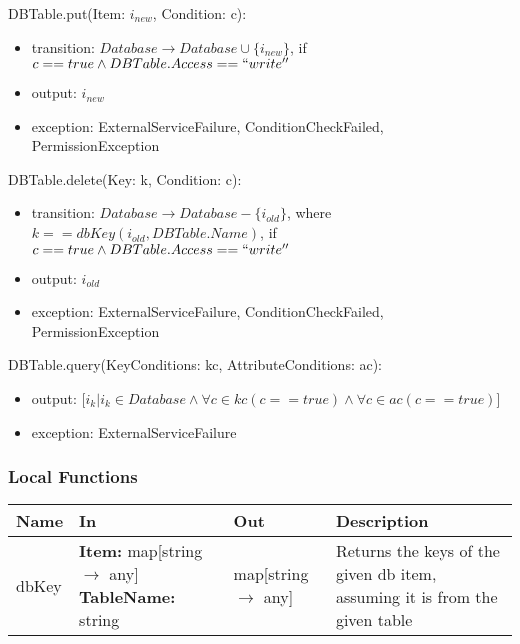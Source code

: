 \documentclass[12pt, titlepage]{article}
\begin{document}
\noindent DBTable.put(Item: $i_{new}$, Condition: c):
\begin{itemize}
  \item transition: $Database \rightarrow Database \cup \{i_{new}\}$, if
    $c == true \land DBTable.Access == ``write''$
  \item output: $i_{new}$
  \item exception: ExternalServiceFailure, ConditionCheckFailed,
    PermissionException
\end{itemize}

\noindent DBTable.delete(Key: k, Condition: c):
\begin{itemize}
  \item transition: $Database \rightarrow Database - \{i_{old}\}$, where
    $k==dbKey(i_{old}, DBTable.Name)$, if $c == true \land
    DBTable.Access == ``write''$
  \item output: $i_{old}$
  \item exception: ExternalServiceFailure, ConditionCheckFailed,
    PermissionException
\end{itemize}

\noindent DBTable.query(KeyConditions: kc, AttributeConditions: ac):
\begin{itemize}
  \item output: [$i_k | i_k \in Database \land \forall c \in kc (c ==
    true) \land \forall c \in ac (c == true)$]
  \item exception: ExternalServiceFailure
\end{itemize}

\subsubsection{Local Functions}

\begin{center}
  \begin{tabular}{>{\raggedright}p{2cm} >{\raggedright}p{5cm}
    >{\raggedright}p{3.5cm} p{4.5cm}}
    \hline
    \textbf{Name} & \textbf{In} & \textbf{Out} & \textbf{Description} \\
    \hline
    dbKey & \textbf{Item:} map[string $\rightarrow$ any] \newline
    \textbf{TableName:} string & map[string $\rightarrow$ any] &
    Returns the keys of the given db item, assuming it is from the
    given table \\
    \hline
  \end{tabular}
\end{center}
\end{document}
